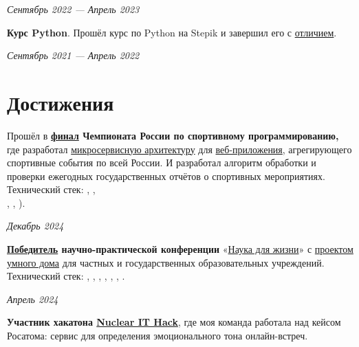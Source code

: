 \documentclass[margin,line]{resume}
\begin{document}
\begin{resume}
  \hfill \textsl{Сентябрь 2022 — Апрель 2023}

  \textbf{Курс Python}. Прошёл курс по Python на Stepik и завершил его с
  \href{https://github.com/alchemmist/CV/blob/main/attachments/stepik-python-course.pdf}{отличием}.

  \vspace{-3mm}

  \hfill \textsl{Сентябрь 2021 — Апрель 2022}

  \section{\mysidestyle Достижения}
  Прошёл в
  \textbf{\href{https://github.com/alchemmist/CV/blob/main/attachments/russian-chemp-final.pdf}{финал}
    Чемпионата России по спортивному
  программированию,} где разработал
  \href{https://github.com/alchemmist/CV/blob/main/attachments/architect.pdf}{микросервисную
  архитектуру} для
  \href{https://github.com/alchemmist/sportporg}{веб-приложения},
  агрегирующего спортивные события по
  всей России. И разработал алгоритм обработки и проверки ежегодных
  государственных
  отчётов о спортивных мероприятиях. Технический стек:
  , , \\
  ,
  ,
).

\vspace{-6mm}

\hfill \textsl{Декабрь 2024}

\textbf{\href{https://github.com/alchemmist/CV/blob/main/attachments/scince-for-life-win.pdf}{Победитель}
научно-практической конференции}
«\href{https://conf.profil.mos.ru/academ}{Наука для
жизни}» с \href{https://github.com/smart-cab/}{проектом умного
дома} для частных и государственных
образовательных учреждений. Технический стек: ,
, , ,
, , .
\vspace{-6mm}

\hfill \textsl{Апрель 2024}

\textbf{Участник хакатона \href{https://nuclearhack.mephi.ru/}{Nuclear
IT Hack}}, где моя команда работала
над кейсом Росатома: сервис для определения эмоционального тона онлайн-встреч.

\vspace{-6mm}


\end{resume}
\end{document}
